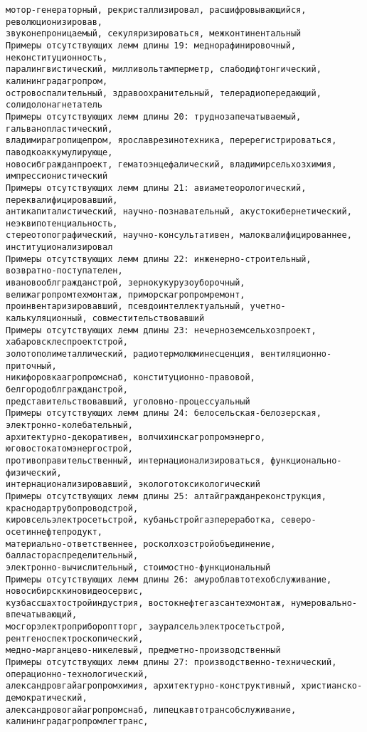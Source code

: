 \documentclass[11pt]{article}
\begin{document}
\begin{Verbatim}[commandchars=\\\{\}]
мотор-генераторный, рекристаллизировал, расшифровывающийся, революционизировав,
звуконепроницаемый, секуляризироваться, межконтинентальный
Примеры отсутствующих лемм длины 19: меднорафинировочный, неконституционность,
паралингвистический, милливольтамперметр, слабодифтонгический, калининградагропром,
островоспалительный, здравоохранительный, телерадиопередающий, солидолонагнетатель
Примеры отсутствующих лемм длины 20: труднозапечатываемый, гальванопластический,
владимирагропищепром, ярославрезинотехника, перерегистрироваться, паводкоаккумулирующе,
новосибгражданпроект, гематоэнцефалический, владимирсельхозхимия, импрессионистический
Примеры отсутствующих лемм длины 21: авиаметеорологический, переквалифицировавший,
антикапиталистический, научно-познавательный, акустокибернетический, неэквипотенциальность,
стереотопографический, научно-консультативен, малоквалифицированнее, институционализировал
Примеры отсутствующих лемм длины 22: инженерно-строительный, возвратно-поступателен,
ивановооблгражданстрой, зернокукурузоуборочный, велижагропромтехмонтаж, приморскагропромремонт,
проинвентаризировавший, псевдоинтеллектуальный, учетно-калькуляционный, совместительствовавший
Примеры отсутствующих лемм длины 23: нечерноземсельхозпроект, хабаровсклеспроектстрой,
золотополиметаллический, радиотермолюминесценция, вентиляционно-приточный,
никифоровкаагропромснаб, конституционно-правовой, белгородоблгражданстрой,
представительствовавший, уголовно-процессуальный
Примеры отсутствующих лемм длины 24: белосельская-белозерская, электронно-колебательный,
архитектурно-декоративен, волчихинскагропромэнерго, юговостокатомэнергострой,
противоправительственный, интернационализироваться, функционально-физический,
интернационализировавший, экологотоксикологический
Примеры отсутствующих лемм длины 25: алтайгражданреконструкция, краснодартрубопроводстрой,
кировсельэлектросетьстрой, кубаньстройгазпереработка, северо-осетиннефтепродукт,
материально-ответственнее, росколхозстройобъединение, балластораспределительный,
электронно-вычислительный, стоимостно-функциональный
Примеры отсутствующих лемм длины 26: амуроблавтотехобслуживание, новосибирсккиновидеосервис,
кузбассшахтостройиндустрия, востокнефтегазсантехмонтаж, нумеровально-впечатывающий,
мосгорэлектроприбороптторг, зауралсельэлектросетьстрой, рентгеноспектроскопический,
медно-марганцево-никелевый, предметно-производственный
Примеры отсутствующих лемм длины 27: производственно-технический, операционно-технологический,
александровгайагропромхимия, архитектурно-конструктивный, христианско-демократический,
александровогайагропромснаб, липецкавтотрансобслуживание, калининградагропромлегтранс,

\end{Verbatim}
\end{document}
